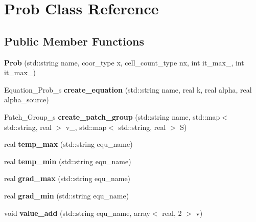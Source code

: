 \hypertarget{classProb}{\section{Prob Class Reference}
\label{classProb}
}
\subsection*{Public Member Functions}
\begin{DoxyCompactItemize}
\item 
\hypertarget{classProb_a4d146873812b11594835eeb221057ce3}{{\bfseries Prob} (std\-::string name, coor\-\_\-type x, cell\-\_\-count\-\_\-type nx, int it\-\_\-max\-\_, int it\-\_\-max\-\_)}\label{classProb_a4d146873812b11594835eeb221057ce3}

\item 
\hypertarget{classProb_a9e42af858cc616a84ffa860ed30703cc}{Equation\-\_\-\-Prob\-\_\-s {\bfseries create\-\_\-equation} (std\-::string name, real k, real alpha, real alpha\-\_\-source)}\label{classProb_a9e42af858cc616a84ffa860ed30703cc}

\item 
\hypertarget{classProb_a3cc8bff1793014e79c9f543c6b06db37}{Patch\-\_\-\-Group\-\_\-s {\bfseries create\-\_\-patch\-\_\-group} (std\-::string name, std\-::map$<$ std\-::string, real $>$ v\-\_, std\-::map$<$ std\-::string, real $>$ S)}\label{classProb_a3cc8bff1793014e79c9f543c6b06db37}

\item 
\hypertarget{classProb_a70dca1f3332e57f72b834ba91d52ca31}{real {\bfseries temp\-\_\-max} (std\-::string equ\-\_\-name)}\label{classProb_a70dca1f3332e57f72b834ba91d52ca31}

\item 
\hypertarget{classProb_ac1bce1f293f1ec1c251730db1a1d0313}{real {\bfseries temp\-\_\-min} (std\-::string equ\-\_\-name)}\label{classProb_ac1bce1f293f1ec1c251730db1a1d0313}

\item 
\hypertarget{classProb_a9fff19c6e6676c72153dc0ed32b1e6a9}{real {\bfseries grad\-\_\-max} (std\-::string equ\-\_\-name)}\label{classProb_a9fff19c6e6676c72153dc0ed32b1e6a9}

\item 
\hypertarget{classProb_a6dc764bdb12b430c1a28d73925f6c6d8}{real {\bfseries grad\-\_\-min} (std\-::string equ\-\_\-name)}\label{classProb_a6dc764bdb12b430c1a28d73925f6c6d8}

\item 
\hypertarget{classProb_a8dd6bf7649956711e74ccc58957186d8}{void {\bfseries value\-\_\-add} (std\-::string equ\-\_\-name, array$<$ real, 2 $>$ v)}\label{classProb_a8dd6bf7649956711e74ccc58957186d8}


\end{DoxyCompactItemize}
